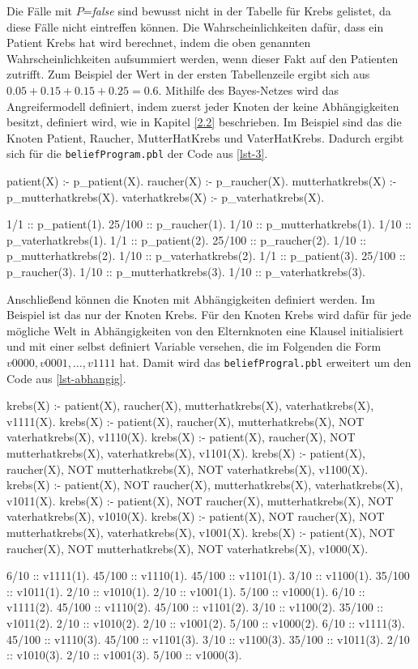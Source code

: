\documentclass[german,version-2020-11]{uzl-thesis}
\begin{document}
Die Fälle mit $P$=\textit{false} sind bewusst nicht in der Tabelle für Krebs gelistet, da diese Fälle nicht eintreffen können. Die Wahrscheinlichkeiten dafür, dass ein Patient Krebs hat wird berechnet, indem die oben genannten Wahrscheinlichkeiten aufsummiert werden, wenn dieser Fakt auf den Patienten zutrifft. Zum Beispiel der Wert in der ersten Tabellenzeile ergibt sich aus $0.05 + 0.15 + 0.15 +0.25 = 0.6$.
Mithilfe des Bayes-Netzes wird das Angreifermodell definiert, indem zuerst jeder Knoten der keine Abhängigkeiten besitzt, definiert wird, wie in Kapitel \cref{2.2} beschrieben. Im Beispiel sind das die Knoten Patient, Raucher, MutterHatKrebs und VaterHatKrebs. Dadurch ergibt sich für die \texttt{beliefProgram.pbl} der Code aus \autoref{lst-3}.
\begin{Pseudocode}[caption={Beispiel für Knoten ohne Abhängigkeiten }, label={lst-3}, numbers=left]
patient(X) :- p_patient(X).
raucher(X) :- p_raucher(X).
mutterhatkrebs(X) :- p_mutterhatkrebs(X).
vaterhatkrebs(X) :- p_vaterhatkrebs(X).
	
1/1 :: p_patient(1).
25/100 :: p_raucher(1).
1/10 :: p_mutterhatkrebs(1).
1/10 :: p_vaterhatkrebs(1).
1/1 :: p_patient(2).
25/100 :: p_raucher(2).
1/10 :: p_mutterhatkrebs(2).
1/10 :: p_vaterhatkrebs(2).
1/1 :: p_patient(3).
25/100 :: p_raucher(3).
1/10 :: p_mutterhatkrebs(3).
1/10 :: p_vaterhatkrebs(3).
\end{Pseudocode}
Anschließend können die Knoten mit Abhängigkeiten definiert werden. Im Beispiel ist das nur der Knoten Krebs. Für den Knoten Krebs wird dafür für jede mögliche Welt in Abhängigkeiten von den Elternknoten eine Klausel initialisiert und mit einer selbst definiert Variable versehen, die im Folgenden die Form $v0000, v0001, \dots , v1111$ hat. Damit wird das \texttt{beliefProgral.pbl} erweitert um den Code aus \autoref{lst-abhangig}.
\begin{Pseudocode}[caption={Beispiel für Knoten mit Abhängigkeiten }, label={lst-abhangig}, numbers=left]
krebs(X) :- patient(X), raucher(X), mutterhatkrebs(X), vaterhatkrebs(X), v1111(X).
krebs(X) :- patient(X), raucher(X), mutterhatkrebs(X), NOT vaterhatkrebs(X), v1110(X).
krebs(X) :- patient(X), raucher(X), NOT mutterhatkrebs(X), vaterhatkrebs(X), v1101(X).
krebs(X) :- patient(X), raucher(X), NOT mutterhatkrebs(X), NOT vaterhatkrebs(X), v1100(X).
krebs(X) :- patient(X), NOT raucher(X), mutterhatkrebs(X), vaterhatkrebs(X), v1011(X).
krebs(X) :- patient(X), NOT raucher(X), mutterhatkrebs(X), NOT vaterhatkrebs(X), v1010(X).
krebs(X) :- patient(X), NOT raucher(X), NOT mutterhatkrebs(X), vaterhatkrebs(X), v1001(X).
krebs(X) :- patient(X), NOT raucher(X), NOT mutterhatkrebs(X), NOT vaterhatkrebs(X), v1000(X).

6/10 :: v1111(1).
45/100 :: v1110(1).
45/100 :: v1101(1).
3/10 :: v1100(1).
35/100 :: v1011(1).
2/10 :: v1010(1).
2/10 :: v1001(1).
5/100 :: v1000(1).
6/10 :: v1111(2).
45/100 :: v1110(2).
45/100 :: v1101(2).
3/10 :: v1100(2).
35/100 :: v1011(2).
2/10 :: v1010(2).
2/10 :: v1001(2).
5/100 :: v1000(2).
6/10 :: v1111(3).
45/100 :: v1110(3).
45/100 :: v1101(3).
3/10 :: v1100(3).
35/100 :: v1011(3).
2/10 :: v1010(3).
2/10 :: v1001(3).
5/100 :: v1000(3).
\end{Pseudocode}
\end{document}
